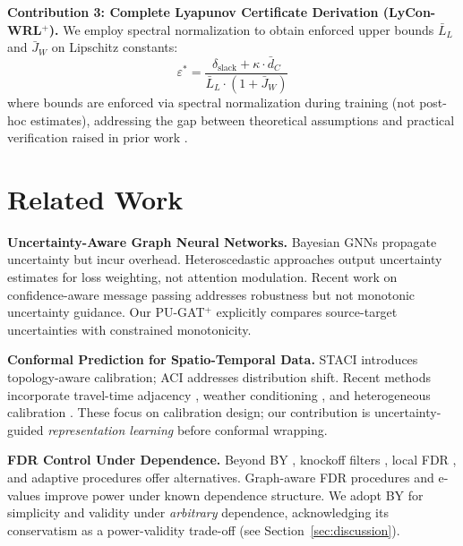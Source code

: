 \documentclass{article}
\theoremstyle{plain}
\theoremstyle{definition}
\theoremstyle{remark}
\begin{document}
\textbf{Contribution 3: Complete Lyapunov Certificate Derivation (LyCon-WRL$^+$).} We employ spectral normalization \citep{miyato2018spectral} to obtain enforced upper bounds $\bar{L}_L$ and $\bar{J}_W$ on Lipschitz constants:
\begin{equation}
\varepsilon^* = \frac{\delta_{\text{slack}} + \kappa \cdot \bar{d}_C}{\bar{L}_L \cdot (1 + \bar{J}_W)}
\label{eq:eps_star_intro}
\end{equation}
where bounds are enforced via spectral normalization during training (not post-hoc estimates), addressing the gap between theoretical assumptions and practical verification raised in prior work \citep{gouk2021regularisation,fazlyab2019efficient}.

\section{Related Work}
\label{sec:related}

\textbf{Uncertainty-Aware Graph Neural Networks.} Bayesian GNNs \citep{zhang2019bayesian,hasanzadeh2020bayesian,pal2020nonparametric} propagate uncertainty but incur overhead. Heteroscedastic approaches \citep{wu2020connecting,gal2016dropout,lakshminarayanan2017simple} output uncertainty estimates for loss weighting, not attention modulation. Recent work on confidence-aware message passing \citep{feng2021kdd,zhao2020uncertainty,stadler2021graph} addresses robustness but not monotonic uncertainty guidance. Our PU-GAT$^+$ explicitly compares source-target uncertainties with constrained monotonicity.

\textbf{Conformal Prediction for Spatio-Temporal Data.} STACI \citep{xu2024staci} introduces topology-aware calibration; ACI \citep{gibbs2021adaptive,zaffran2022adaptive} addresses distribution shift. Recent methods incorporate travel-time adjacency \citep{jensen2024travel}, weather conditioning \citep{liu2024weather}, and heterogeneous calibration \citep{romano2019conformalized,sesia2021conformal,feldman2021improving}. These focus on calibration design; our contribution is uncertainty-guided \emph{representation learning} before conformal wrapping.

\textbf{FDR Control Under Dependence.} Beyond BY \citep{benjamini2001control}, knockoff filters \citep{barber2015controlling,candes2018panning}, local FDR \citep{efron2012large,storey2003positive}, and adaptive procedures \citep{blanchard2020post,ramdas2019unified,lei2018adapt} offer alternatives. Graph-aware FDR procedures \citep{lihua2017general,ramdas2017online} and e-values \citep{vovk2021evalues,grunwald2024safe} improve power under known dependence structure. We adopt BY for simplicity and validity under \emph{arbitrary} dependence, acknowledging its conservatism as a power-validity trade-off (see Section~\ref{sec:discussion}).
\end{document}
